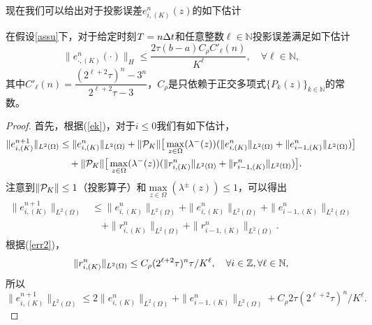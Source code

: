 现在我们可以给出对于投影误差$e^n_{i,(K)}(z)$的如下估计
\begin{lem}\label{hy_pr_e}
  在假设\ref{assu}下，对于给定时刻$T = n\Delta t$和任意整数$\ell\in\mathbb{N}$投影误差满足如下估计
  \begin{equation}
    \|e^n_{\cdot,(K)}(\cdot)\|_H \leq \frac{2\tau(b-a)C_\rho C'_\ell(n)}{K^\ell}, \quad \forall\ell\in\mathbb{N},
  \end{equation}
  其中$C'_{\ell}(n)= \dfrac{(2^{\ell+2}\tau)^n - 3^n}{2^{\ell+2}\tau - 3}$，$C_\rho$是只依赖于正交多项式$\{P_k(z)\}_{k\in\mathbb{N}}$的常数。
\end{lem}
\begin{proof}
  首先，根据(\ref{ek})，对于$i\leq 0$我们有如下估计，
  \begin{equation}
    \begin{split}
      \|e^{n+1}_{i,(K)}\|_{L^2(\Omega)} & \leq \|e^n_{i,(K)}\|_{L^2(\Omega)} + \|\mathcal{P}_K\| \big[\max\limits_{z\in\Omega}(\lambda^-(z))(\|e^n_{i,(K)}\|_{L^2(\Omega)} + \|e^n_{i-1,(K)}\|_{L^2(\Omega)})\big] \\
      &\quad + \|\mathcal{P}_K\| \big[\max\limits_{z\in\Omega}(\lambda^-(z))(\|r^n_{i,(K)}\|_{L^2(\Omega)} + \|r^n_{i-1,(K)}\|_{L^2(\Omega)})\big].
    \end{split}
  \end{equation}
  注意到$\|\mathcal{P}_K\|\leq 1$（投影算子）和$\max\limits_{z\in\Omega}(\lambda^{\pm}(z))\leq 1$，可以得出
  \begin{equation}
    \begin{split}
      \|e^{n+1}_{i,(K)}\|_{L^2(\Omega)} & \leq \|e^n_{i,(K)}\|_{L^2(\Omega)} + \|e^n_{i,(K)}\|_{L^2(\Omega)} + \|e^n_{i-1,(K)}\|_{L^2(\Omega)} \\
      &\quad + \|r^n_{i,(K)}\|_{L^2(\Omega)} + \|r^n_{i-1,(K)}\|_{L^2(\Omega)}.
    \end{split}
  \end{equation}
  根据(\ref{err2})，
  \begin{equation}
    \|r^n_{i,(K)}\|_{L^2(\Omega)}\leq C_\rho (2^{\ell+2}\tau)^n\tau/K^\ell, \quad\forall i\in{\mathbb{Z}}, \forall \ell\in\mathbb{N},
  \end{equation}
  所以
  \begin{equation}
    \|e^{n+1}_{i,(K)}\|_{L^2(\Omega)} \leq 2\|e^n_{i,(K)}\|_{L^2(\Omega)} + \|e^n_{i-1,(K)}\|_{L^2(\Omega)} + C_\rho 2\tau(2^{\ell+2}\tau)^n/K^\ell.
  \end{equation}


\end{proof}
